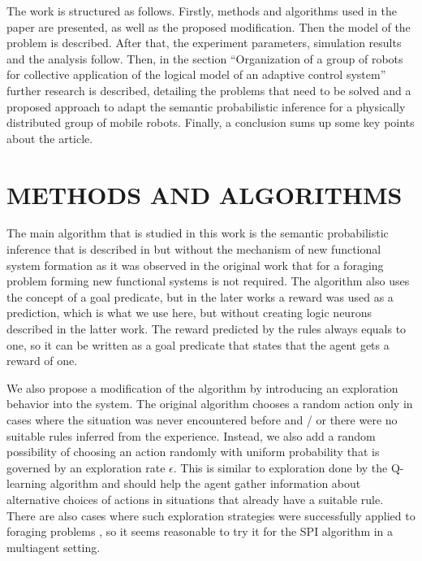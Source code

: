 \documentclass[a4paper,twocolumn]{article}
\begin{document}
The work is structured as follows. Firstly, methods
and algorithms used in the paper are presented, as well
as the proposed modification. Then the model of the
problem is described. After that, the experiment parameters, simulation results and the analysis follow. Then,
in the section ``Organization of a group of robots for
collective application of the logical model of an adaptive
control system'' further research is described, detailing
the problems that need to be solved and a proposed
approach to adapt the semantic probabilistic inference for
a physically distributed group of mobile robots. Finally,
a conclusion sums up some key points about the article.

\section{METHODS AND ALGORITHMS}

The main algorithm that is studied in this work is the
semantic probabilistic inference that is described in \cite{9}
but without the mechanism of new functional system
formation as it was observed in the original work that
for a foraging problem forming new functional systems
is not required. The algorithm also uses the concept of
a goal predicate, but in the later works \cite{1} a reward
was used as a prediction, which is what we use here,
but without creating logic neurons described in the latter
work. The reward predicted by the rules always equals
to one, so it can be written as a goal predicate that states
that the agent gets a reward of one.

We also propose a modification of the algorithm by
introducing an exploration behavior into the system.
The original algorithm chooses a random action only
in cases where the situation was never encountered
before and / or there were no suitable rules inferred
from the experience. Instead, we also add a random
possibility of choosing an action randomly with uniform
probability that is governed by an exploration rate $\epsilon$.
This is similar to exploration done by the Q-learning
algorithm and should help the agent gather information
about alternative choices of actions in situations that
already have a suitable rule. There are also cases where
such exploration strategies were successfully applied to
foraging problems \cite{6}, so it seems reasonable to try it
for the SPI algorithm in a multiagent setting.
\end{document}
